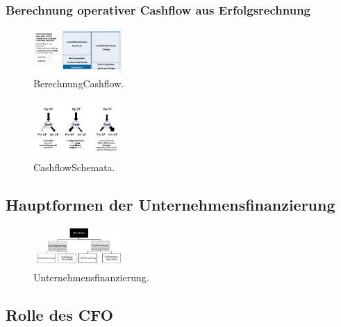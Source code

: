 \documentclass[../ZF_Wing.tex]{subfiles}
\begin{document}
\subsubsection{Berechnung operativer Cashflow aus Erfolgsrechnung}
\begin{multicols}{2}
\begin{figure}[H]
\includegraphics[width=0.3\textwidth]{Resources/Image/BerechnungCashflow.png}
\caption{\label{fig:BerechnungCashflow}BerechnungCashflow.}
\end{figure}

\columnbreak

\begin{figure}[H]
\includegraphics[width=0.3\textwidth]{Resources/Image/CashflowSchemata.png}
\caption{\label{fig:CashflowSchemata}CashflowSchemata.}
\end{figure}

\end{multicols}


\subsection{Hauptformen der Unternehmensfinanzierung}

\begin{figure}[H]
\centering
\includegraphics[width=0.3\textwidth]{Resources/Image/Unternehmensfinanzierung.png}
\caption{\label{fig:Unternehmensfinanzierung}Unternehmensfinanzierung.}
\end{figure}

\subsection{Rolle des CFO}
\end{document}
